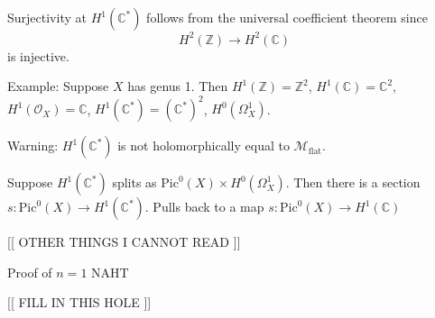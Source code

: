 Surjectivity at $H^1( \mathbb{C} ^* ) $ follows from the universal coefficient theorem since 
\begin{equation}
    H^2 (\mathbb{Z} ) \rightarrow H^2 ( \mathbb{C} ) 
\end{equation}
is injective. 

Example: 
Suppose $X$ has genus 1. 
Then 
$H^1(\mathbb{Z} ) = \mathbb{Z} ^2 $, $ H^1 ( \mathbb{C} ) = \mathbb{C} ^2 $, $H^1 ( \mathcal{O} _X )  = \mathbb{C} $, 
$H^1(\mathbb{C} ^*) = (\mathbb{C} ^*) ^2 $, $H^0 (\Omega_X ^1) $. 

Warning: 
$H^1 ( \mathbb{C} ^* ) $ is not holomorphically equal to $\mathcal{M} _{\mathrm{flat}} $.

Suppose $H^1 ( \mathbb{C} ^* )$ splits as $ \mathrm{Pic} ^0 (X) \times H^0 (\Omega_X ^1 ) $. 
Then there is a section $s: \mathrm{Pic}^0 (X) \rightarrow  H^1 ( \mathbb{C} ^*) $. 
Pulls back to a map $ s: \mathrm{Pic}^0 (X) \rightarrow H^1 (\mathbb{C} ) $

[[ OTHER THINGS I CANNOT READ ]] 




Proof of $n=1 $ NAHT 

[[ FILL IN THIS HOLE ]] 













 

